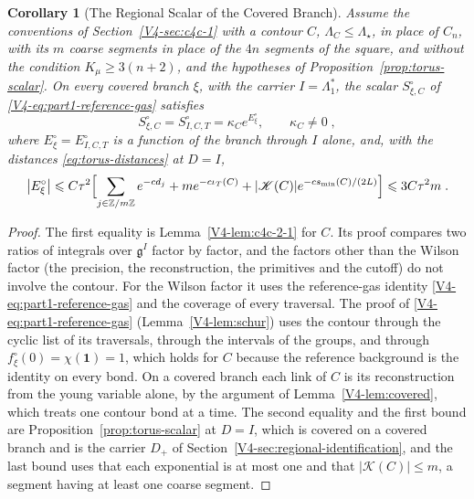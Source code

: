 \documentclass[11pt]{article}
\newcommand{\id}{\mathbf 1}
\numberwithin{equation}{section}
\newtheorem{corollary}[theorem]{Corollary}
\theoremstyle{remark}
\theoremstyle{plain}
\begin{document}
\begin{corollary}[The Regional Scalar of the Covered Branch]\label{cor:torus-branch}
Assume the conventions of Section~\ref{V4-sec:c4c-1} with a contour $C$, $\Lambda_C\leqslant \Lambda_{\star}$, in place of $C_n$, with its $m$ coarse segments in place of the $4n$ segments of the square, and without the condition $K_{\mu}\geqslant 3(n+2)$, and the hypotheses of Proposition~\ref{prop:torus-scalar}. On every covered branch $\xi$, with the carrier $I=\Lambda_1^*$, the scalar $S^{\circ}_{\xi,C}$ of \eqref{V4-eq:part1-reference-gas} satisfies
\begin{equation}\label{eq:torus-branch}
    S^{\circ}_{\xi,C}= S^{\circ}_{I,C,T}=\kappa_Ce^{E^{\circ}_{\xi}},
    \qquad \kappa_C\neq0\;,
\end{equation}
where $E^{\circ}_{\xi}= E^{\circ}_{I,C,T}$ is a function of the branch through $I$ alone, and, with the distances \eqref{eq:torus-distances} at $D= I$,
\begin{equation}\label{eq:torus-branch-bound}
    \bigl| E^{\circ}_{\xi}\bigr|\leqslant C\tau^2\Bigl[\sum_{j\in\mathbb Z/m\mathbb Z}e^{-cd_j}+me^{-c\iota_T(C)}+|\mathscr K(C)|e^{-cs_{\min}(C)/(2L)}\Bigr]\leqslant 3C\tau^2m\;.
\end{equation}
\end{corollary}

\begin{proof}
The first equality is Lemma~\ref{V4-lem:c4c-2-1} for $C$. Its proof compares two ratios of integrals over $\mathfrak g^I$ factor by factor, and the factors other than the Wilson factor (the precision, the reconstruction, the primitives and the cutoff) do not involve the contour. For the Wilson factor it uses the reference-gas identity \eqref{V4-eq:part1-reference-gas} and the coverage of every traversal. The proof of \eqref{V4-eq:part1-reference-gas} (Lemma~\ref{V4-lem:schur}) uses the contour through the cyclic list of its traversals, through the intervals of the groups, and through $f^{\circ}_{\xi}(0)=\chi(\id)=1$, which holds for $C$ because the reference background is the identity on every bond. On a covered branch each link of $C$ is its reconstruction from the young variable alone, by the argument of Lemma~\ref{V4-lem:covered}, which treats one contour bond at a time. The second equality and the first bound are Proposition~\ref{prop:torus-scalar} at $D= I$, which is covered on a covered branch and is the carrier $D_+$ of Section~\ref{V4-sec:regional-identification}, and the last bound uses that each exponential is at most one and that $|\mathscr K(C)|\leqslant m$, a segment having at least one coarse segment.
\end{proof}
\end{document}
